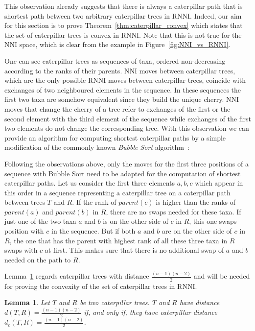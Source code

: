 \documentclass[11pt, a4paper]{article}
\newcommand{\nni}{\mathrm{NNI}}
\newcommand{\rnni}{\mathrm{RNNI}}
\newtheorem{lemma}[definition]{Lemma}
\begin{document}
This observation already suggests that there is always a caterpillar path that is shortest path between two arbitrary caterpillar trees in $\rnni$.
Indeed, our aim for this section is to prove Theorem~\ref{thm:caterpillar_convex} which states that the set of caterpillar trees is convex in $\rnni$.
Note that this is not true for the $\nni$ space, which is clear from the example in Figure~\ref{fig:NNI_vs_RNNI}.

One can see caterpillar trees as sequences of taxa, ordered non-decreasing according to the ranks of their parents.
$\nni$ moves between caterpillar trees, which are the only possible $\rnni$ moves between caterpillar trees, coincide with exchanges of two neighboured elements in the sequence.
In these sequences the first two taxa are somehow equivalent since they build the unique cherry.
$\nni$ moves that change the cherry of a tree refer to exchanges of the first or the second element with the third element of the sequence while exchanges of the first two elements do not change the corresponding tree.
With this observation we can provide an algorithm for computing shortest caterpillar paths by a simple modification of the commonly known \emph{Bubble Sort} algorithm~\cite{knuth1997}:

Following the observations above, only the moves for the first three positions of a sequence with Bubble Sort need to be adapted for the computation of shortest caterpillar paths.
Let us consider the first three elements $a,b,c$ which appear in this order in a sequence representing a caterpillar tree on a caterpillar path between trees $T$ and $R$.
If the rank of $parent(c)$ is higher than the ranks of $parent(a)$ and $parent(b)$ in $R$, there are no swaps needed for these taxa.
If just one of the two taxa $a$ and $b$ is on the other side of $c$ in $R$, this one swaps position with $c$ in the sequence.
But if both $a$ and $b$ are on the other side of $c$ in $R$, the one that has the parent with highest rank of all these three taxa in $R$ swaps with $c$ at first.
This makes sure that there is no additional swap of $a$ and $b$ needed on the path to $R$.

Lemma~\ref{lemma:caterpillar_dist=diameter} regards caterpillar trees with distance $\frac{(n-1)(n-2)}{2}$ and will be needed for proving the convexity of the set of caterpillar trees in $\rnni$.

\begin{lemma}
    Let $T$ and $R$ be two caterpillar trees.
    $T$ and $R$ have distance $d(T,R) = \frac{(n-1)(n-2)}{2}$ if, and only if, they have caterpillar distance $d_c(T,R) = \frac{(n-1)(n-2)}{2}$.
    \label{lemma:caterpillar_dist=diameter}
\end{lemma}
\end{document}

